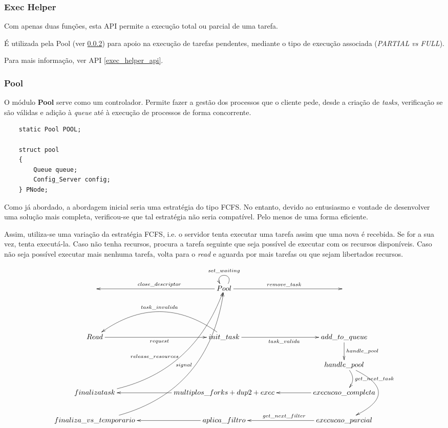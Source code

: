 \documentclass[11pt]{article}
\begin{document}
\subsubsection{Exec Helper}\label{exec_helper}

Com apenas duas funções, esta API permite a execução total ou parcial de uma tarefa.

É utilizada pela Pool (ver \ref{pool}) para apoio na execução de tarefas pendentes, mediante o tipo de execução associada (\textit{PARTIAL vs FULL}).

Para mais informação, ver API \ref{exec_helper_api}.

\subsubsection{Pool} \label{pool}

O módulo \textbf{Pool} serve como um controlador. Permite fazer a gestão dos processos que o cliente pede, desde a
criação de \textit{tasks}, verificação se são válidas e adição à \textit{queue} até à execução de processos de forma concorrente.

\begin{verbatim}
    static Pool POOL;

    struct pool
    {
        Queue queue;
        Config_Server config;
    } PNode;
\end{verbatim}

Como já abordado, a abordagem inicial seria uma estratégia do tipo FCFS. No entanto, devido ao entusiasmo e vontade de desenvolver uma solução
mais completa, verificou-se que tal estratégia não seria compatível. Pelo menos de uma forma eficiente.

Assim, utiliza-se uma variação da estratégia FCFS, i.e. o servidor tenta executar uma tarefa assim que uma nova é recebida.
Se for a sua vez, tenta executá-la.
Caso não tenha recursos, procura a tarefa seguinte que seja possível de executar com os recursos disponíveis.
Caso não seja possível executar mais nenhuma tarefa,
volta para o \textit{read} e aguarda por mais tarefas ou que sejam libertados recursos.

\begin{equation*}
    \xymatrixcolsep{4pc}\xymatrix{
    & Pool\ar[l]_{close\_descriptor}\ar[r]^{remove\_task}\ar@(ur, ul)_{set\_waiting} & \\
    & & \\
    Read\ar[r]_{request} & init\_task\ar@/_3pc/[l]_{task\_invalida}\ar[r]_{task\_valida} & add\_to\_queue\ar[d]^{handle\_pool} \\
    & & handle\_pool\ar@/^1pc/[d]^{get\_next\_task}\ar@/^4pc/[dd] \\
    finaliza task\ar@/_3pc/[uuuur]_{signal}^{release\_resources} & multiplos\_forks+dup2+exec\ar[l] & execucao\_completa\ar[l] \\
    finaliza\_vs\_temporario\ar@/_4pc/[uuuuur] & aplica\_filtro\ar[l] & execucao\_parcial\ar[l]_{get\_next\_filter} \\
    }
\end{equation*}
\end{document}

